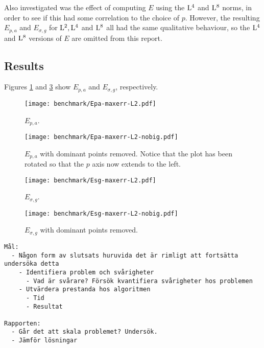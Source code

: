 Also investigated was the effect of computing $E$ using the $\Lp[4]$
and $\Lp[8]$ norms, in order to see if this had some correlation to
the choice of $p$. However, the resulting $E_{p,a}$ and $E_{\sigma,g}$ for
$\Lp[2], \Lp[4]$ and $\Lp[8]$ all had the same qualitative behaviour,
so the $\Lp[4]$ and $\Lp[8]$ versions of $E$ are omitted from this
report.

\subsection{Results}
Figures \ref{fig:Epa-maxerr-L2} and \ref{fig:Esg-maxerr-L2} show
$E_{p,a}$ and $E_{\sigma,g}$, respectively.

\begin{figure}[hb]
  \centering
  \texttt{[image: benchmark/Epa-maxerr-L2.pdf]}
  \caption{$E_{p,a}$.}
  \label{fig:Epa-maxerr-L2}
\end{figure}

\begin{figure}
  \centering
  \texttt{[image: benchmark/Epa-maxerr-L2-nobig.pdf]}
  \caption{$E_{p,a}$ with dominant points removed. Notice that the
    plot has been rotated so that the $p$ axis now extends to the
    left.}
  \label{fig:Epa-maxerr-L2-nobig}
\end{figure}

\begin{figure}
  \centering
  \texttt{[image: benchmark/Esg-maxerr-L2.pdf]}
  \caption{$E_{\sigma,g}$.}
  \label{fig:Esg-maxerr-L2}
\end{figure}

\begin{figure}
  \centering
  \texttt{[image: benchmark/Esg-maxerr-L2-nobig.pdf]}
  \caption{$E_{\sigma,g}$ with dominant points removed.}
  \label{fig:Esg-maxerr-L2-nobig}
\end{figure}

\begin{verbatim}
Mål:
  - Någon form av slutsats huruvida det är rimligt att fortsätta
undersöka detta
    - Identifiera problem och svårigheter
      - Vad är svårare? Försök kvantifiera svårigheter hos problemen
    - Utvärdera prestanda hos algoritmen
      - Tid
      - Resultat

Rapporten:
  - Går det att skala problemet? Undersök.
  - Jämför lösningar
\end{verbatim}

